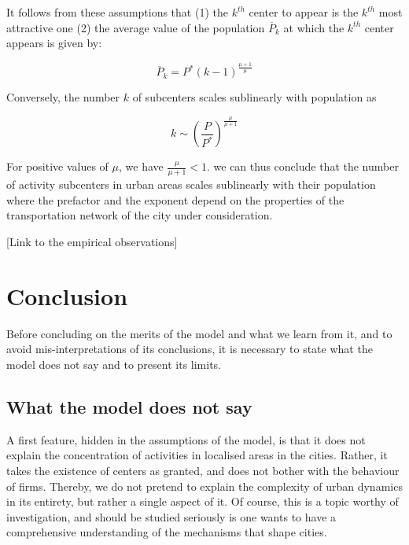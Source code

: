 It follows from these assumptions that (1) the $k^{th}$ center to appear is the
$k^{th}$ most attractive one (2) the average value of the population
$\overline{P}_k$ at which the $k^{th}$ center appears is given by:

\begin{equation} 
    \overline{P}_k = P^* \left( k-1 \right)^{\frac{\mu+1}{\mu}}
\end{equation}

Conversely, the number $k$ of subcenters scales sublinearly with population as

\begin{equation} 
    \boxed{k \sim \left( \frac{P}{P^*} \right)^{\frac{\mu}{\mu
    + 1}}}
    \label{eq:centers_prediction}
\end{equation} 

For positive values of $\mu$, we have $\frac{\mu}{\mu+1}<1$. we can thus
conclude that the number of activity subcenters in urban areas scales sublinearly
with their population where the prefactor and the exponent depend on the
properties of the transportation network of the city under consideration. 

[Link to the empirical observations]

\section{Conclusion}
\label{sec:conclusion}

Before concluding on the merits of the model and what we learn from it, and to
avoid mis-interpretations of its conclusions, it is necessary to state what the
model does not say and to present its limits.

\subsection{What the model does not say}
\label{sec:what_the_model_does_not_say}


A first feature, hidden in the assumptions of the model, is that it does
not explain the concentration of activities in localised areas in the cities.
Rather, it takes the existence of centers as granted, and does not bother with
the behaviour of firms. Thereby, we do not pretend to explain the complexity of
urban dynamics in its entirety, but rather a single aspect of it. Of course,
this is a topic worthy of investigation, and should be studied seriously is one
wants to have a comprehensive understanding of the mechanisms that shape cities.

